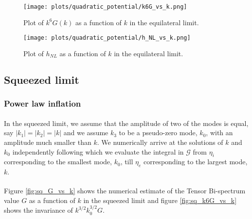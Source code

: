 \documentclass[12pt,a4paper,oneside]{book}
\begin{document}
\begin{figure}
\begin{center}
\texttt{[image: plots/quadratic\_potential/k6G\_vs\_k.png]}
\caption[Plot of $k^6G(k)$ as a function of $k$ in the equilateral limit in quadratic potential model.]
{Plot of $k^6G(k)$ as a function of $k$ in the equilateral limit.}
\label{fig:eq_k6G_vs_k_quad}
\end{center}
\end{figure}

\begin{figure}
\begin{center}
\texttt{[image: plots/quadratic\_potential/h\_NL\_vs\_k.png]}
\caption[Plot of $h_{NL}$ as a function of $k$ in the equilateral limit in quadratic potential model.]
{Plot of $h_{NL}$ as a function of $k$ in the equilateral limit.}
\label{fig:eq_h_NL_vs_k_quad}
\end{center}
\end{figure}

\subsection{Squeezed limit}

\subsubsection{Power law inflation}

\paragraph*{} In the squeezed limit, we assume that the amplitude of two of the modes is equal, say $|k_1|=|k_2|= |k|$ 
and we assume $k_3$ to be a pseudo-zero mode, $k_0$, with an amplitude much smaller than $k$. We numerically arrive 
at the solutions of $k$ and $k_0$ independently following which we evaluate the integral in $\mathcal{G}$ from $\eta_i$ 
corresponding to the smallest mode, $k_0$, till $\eta_e$ corresponding to the largest mode, $k$.

\paragraph*{} Figure \ref{fig:sq_G_vs_k} shows the numerical estimate of the Tensor Bi-spectrum value $G$ as a function of $k$ 
in the squeezed limit and figure \ref{fig:sq_k6G_vs_k} shows the invariance of $k^{3/2}k_0^{3/2}G$. 
\end{document}

